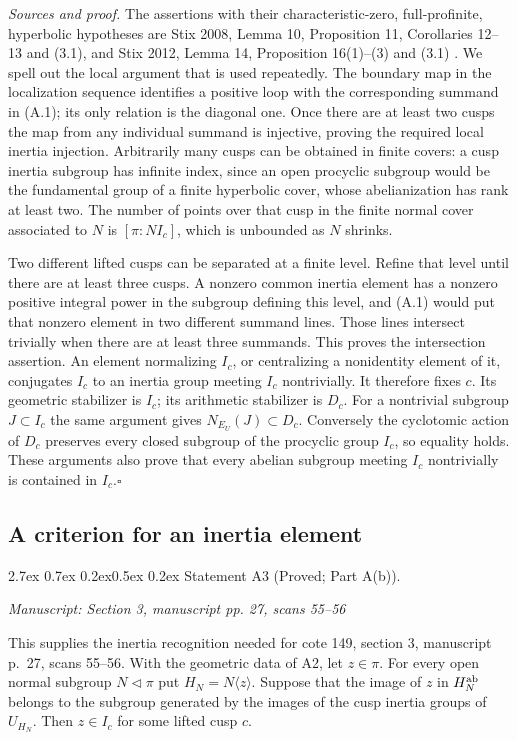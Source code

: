 \documentclass[11pt,a4paper]{article}
\makeatletter
\newcommand{\passage}[1]{\par\smallskip\noindent\textit{Manuscript: #1}\par\smallskip}
\renewcommand\paragraph{\@startsection{paragraph}{4}{\z@}%
  {2.7ex \@plus 0.7ex \@minus 0.2ex}{0.5ex \@plus 0.2ex}%
  {\normalfont\normalsize\bfseries}}
\makeatother
\begin{document}
\emph{Sources and proof.} The assertions with their characteristic-zero, full-profinite, hyperbolic hypotheses are Stix 2008, Lemma 10, Proposition 11, Corollaries 12--13 and (3.1), and Stix 2012, Lemma 14, Proposition 16(1)--(3) and (3.1) \cite{Stix2008,Stix2012}. We spell out the local argument that is used repeatedly. The boundary map in the localization sequence identifies a positive loop with the corresponding summand in (A.1); its only relation is the diagonal one. Once there are at least two cusps the map from any individual summand is injective, proving the required local inertia injection. Arbitrarily many cusps can be obtained in finite covers: a cusp inertia subgroup has infinite index, since an open procyclic subgroup would be the fundamental group of a finite hyperbolic cover, whose abelianization has rank at least two. The number of points over that cusp in the finite normal cover associated to $N$ is $[\pi:NI_c]$, which is unbounded as $N$ shrinks.

Two different lifted cusps can be separated at a finite level. Refine that level until there are at least three cusps. A nonzero common inertia element has a nonzero positive integral power in the subgroup defining this level, and (A.1) would put that nonzero element in two different summand lines. Those lines intersect trivially when there are at least three summands. This proves the intersection assertion. An element normalizing $I_c$, or centralizing a nonidentity element of it, conjugates $I_c$ to an inertia group meeting $I_c$ nontrivially. It therefore fixes $c$. Its geometric stabilizer is $I_c$; its arithmetic stabilizer is $D_c$. For a nontrivial subgroup $J\subset I_c$ the same argument gives $N_{E_U}(J)\subset D_c$. Conversely the cyclotomic action of $D_c$ preserves every closed subgroup of the procyclic group $I_c$, so equality holds. These arguments also prove that every abelian subgroup meeting $I_c$ nontrivially is contained in $I_c$.\hfill$\square$

\subsection{A criterion for an inertia element}
\paragraph{Statement A3 (Proved; Part A(b)).}\label{res:A3}
\passage{Section 3, manuscript pp. 27, scans 55–56}

This supplies the inertia recognition needed for cote 149, section 3, manuscript p.~27, scans 55--56.
With the geometric data of A2, let $z\in\pi$. For every open normal subgroup $N\triangleleft\pi$ put $H_N=N\langle z\rangle$. Suppose that the image of $z$ in $H_N^{\rm ab}$ belongs to the subgroup generated by the images of the cusp inertia groups of $U_{H_N}$. Then $z\in I_c$ for some lifted cusp $c$.
\end{document}
